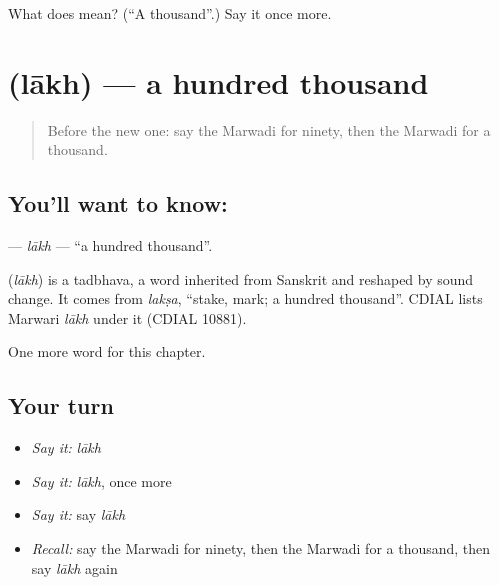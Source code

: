 \begin{tcolorbox}[breakable,colback=teal!4,colframe=teal!35!black,title={Before you move on}]
What does  mean? (\textquotedblleft{}A thousand\textquotedblright{}.) Say it once more.
\end{tcolorbox}
\section[\texorpdfstring{\mw{लाख} (lākh)}{लाख (lākh)}]{ (lākh) — a hundred thousand}

\label{lesson:MW-C87-lakh}



\begin{quote}
Before the new one: say the Marwadi for ninety, then the Marwadi for a thousand.
\end{quote}

\subsection*{You'll want to know: }
\textbf{} — \emph{lākh} — \textquotedblleft{}a hundred thousand\textquotedblright{}.

\begin{cousinweb}
\textbf{} (\emph{lākh}) is a tadbhava, a word inherited from Sanskrit and reshaped by sound change. It comes from \emph{lakṣa}, \textquotedblleft{}stake, mark; a hundred thousand\textquotedblright{}. CDIAL lists Marwari \emph{lākh} under it (CDIAL 10881).
\end{cousinweb}

\begin{grammarlens}[title={What you've built}]
One more word for this chapter.
\end{grammarlens}

\subsection*{Your turn}
\begin{itemize}
\raggedright
  \item \emph{Say it:} \emph{lākh}
  \item \emph{Say it:} \emph{lākh}, once more
  \item \emph{Say it:} say \emph{lākh}
  \item \emph{Recall:} say the Marwadi for ninety, then the Marwadi for a thousand, then say \emph{lākh} again
\end{itemize}

